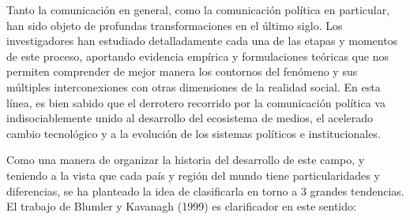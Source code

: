 \documentclass[
  10pt,
  letterpaper,
]{report}
\begin{document}
Tanto la comunicación en general, como la comunicación política en
particular, han sido objeto de profundas transformaciones en el último
siglo. Los investigadores han estudiado detalladamente cada una de las
etapas y momentos de este proceso, aportando evidencia empírica y
formulaciones teóricas que nos permiten comprender de mejor manera los
contornos del fenómeno y sus múltiples interconexiones con otras
dimensiones de la realidad social. En esta línea, es bien sabido que el
derrotero recorrido por la comunicación política va indisociablemente
unido al desarrollo del ecosistema de medios, el acelerado cambio
tecnológico y a la evolución de los sistemas políticos e
institucionales.

Como una manera de organizar la historia del desarrollo de este campo, y
teniendo a la vista que cada país y región del mundo tiene
particularidades y diferencias, se ha planteado la idea de clasificarla
en torno a 3 grandes tendencias. El trabajo de Blumler y Kavanagh (1999)
es clarificador en este sentido:
\end{document}

